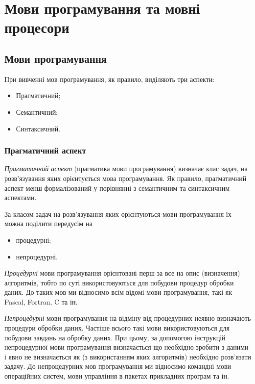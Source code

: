\setcounter{section}{0}

\section{Мови програмування та мовні процесори} 

\subsection{Мови програмування}

При вивченні мов програмування, як правило, виділяють три аспекти:
\begin{itemize}
	\item Прагматичний;
	\item Семантичний;
	\item Синтаксичний.
\end{itemize}

\subsubsection{Прагматичний аспект}

\textit{Прагматичний аспект} (прагматика мови програмування) визначає клас задач, на розв'язування яких орієнтується мова програмування. Як правило, прагматичний аспект менш формалізований у порівнянні з семантичним та синтаксичним аспектами. \medskip

За класом задач на розв'язування яких орієнтуються мови програмування їх можна поділити передусім на 
\begin{itemize}
	\item процедурні;
	\item непроцедурні.
\end{itemize}

\textit{Процедурні} мови програмування орієнтовані перш за все на опис (визначення) алгоритмів, тобто по суті використовуються для побудови процедур обробки даних. До таких мов ми відносимо всім відомі мови програмування, такі як Pascal, Fortran, C та ін. \medskip

\textit{Непроцедурні} мови програмування на відміну від процедурних неявно визначають процедури обробки даних. Частіше всього такі мови використовуються для побудови завдань на обробку даних. При цьому, за допомогою інструкцій непроцедурної мови програмування визначається що необхідно зробити з даними і явно не визначається як (з використанням яких алгоритмів) необхідно розв'язати задачу. До непроцедурних мов програмування ми відносимо командні мови операційних систем, мови управління в пакетах прикладних програм та ін. \medskip

